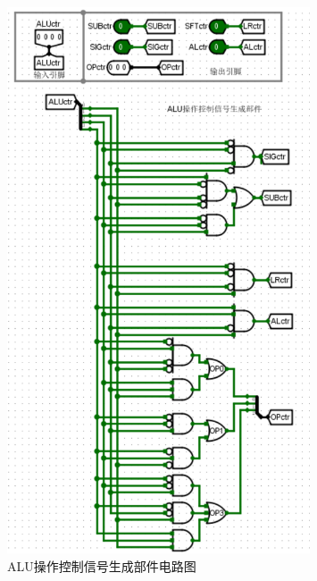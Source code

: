 \documentclass{article}
\begin{document}
    \begin{figure}[H]
    \centering
    \includegraphics[width=0.8\textwidth]{5.4.2.png}
    \caption{ALU操作控制信号生成部件电路图}
    \end{figure}
\end{document}
